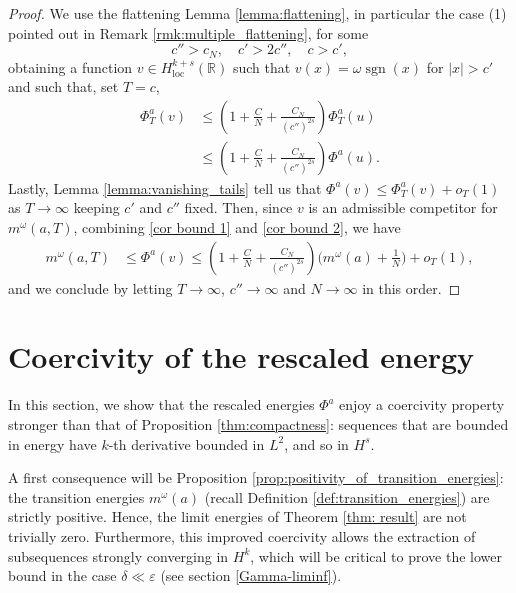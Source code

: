 \documentclass{article}
\theoremstyle{definition}
\newcommand{\de}{\mathrm{d}}
\newcommand{\R}{\mathbb{R}}
\newcommand{\e}{\varepsilon}
\def\e{\varepsilon}
\newcommand{\sgn}{\operatorname{sgn}}
\begin{document}
\begin{proof}
     We use the flattening Lemma \ref{lemma:flattening}, in particular the case (1) pointed out in Remark \ref{rmk:multiple_flattening}, for some  
     \[c''> c_N,\quad c'>2c'', \quad c>c',\]
     obtaining a function $v\in H^{k+s}_{\operatorname{loc}}(\R)$ such that $v(x) = \omega \sgn(x)$ for $|x|> c'$ and such that, set $T=c$,
     \begin{equation}
     \label{cor bound 2}
        \begin{split}
            \Phi^{a}_T(v)&\leq \left(1 +  \frac{C}{N}+ \frac{C_N}{(c'')^{2s}}\right)\Phi^{a}_T(u)\\
            &\leq \left(1 +  \frac{C}{N}+ \frac{C_N}{(c'')^{2s}}\right)\Phi^{a}(u).%
        \end{split}
     \end{equation}
  Lastly, Lemma \ref{lemma:vanishing_tails} tell us that $\Phi^{a}(v) \leq \Phi^{a}_T(v) + o_T(1)$ as $T \to \infty$ keeping $c'$ and $c''$ fixed. Then, since $v$ is an admissible competitor for $m^\omega(a,T)$, combining  \eqref{cor bound 1} and \eqref{cor bound 2}, we have
  \begin{align*}
       m^\omega(a,T)&\leq \Phi^a(v)\leq \left(1 +  \frac{C}{N}+ \frac{C_N}{(c'')^{2s}}\right)\Big(m^\omega(a)+\frac{1}{N}\Big)+o_T(1),
  \end{align*}
  and we conclude by letting $T\to \infty$, $c''\to \infty$ and $N\to \infty$ in this order.
    \end{proof}


\section{Coercivity of the rescaled energy}

In this section, we show that the rescaled energies $\Phi^a$ enjoy a coercivity property stronger than that of Proposition \ref{thm:compactness}: sequences that are bounded in energy have $k$-th derivative bounded in $L^2$, and so in $H^{s}$. 

A first consequence will be Proposition \ref{prop:positivity_of_transition_energies}: the transition energies $m^\omega(a)$ (recall Definition \ref{def:transition_energies}) are strictly positive. Hence, the limit energies of Theorem \ref{thm: result} are not trivially zero. 
Furthermore, this improved coercivity allows the extraction of subsequences strongly converging in $H^k$, which will be critical to prove the lower bound in the case $\delta\ll \e$ (see section \ref{Gamma-liminf}).
\end{document}
